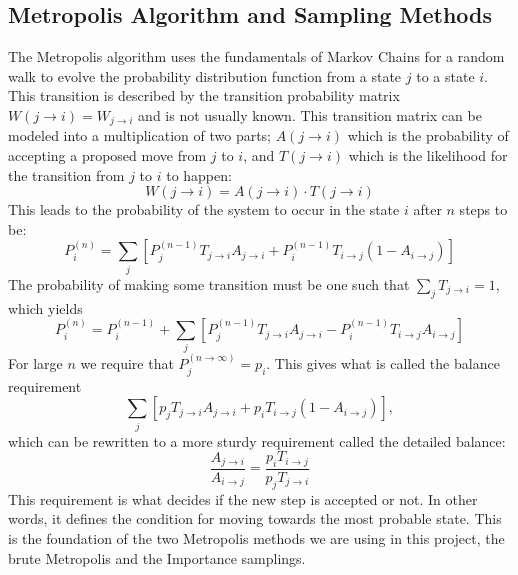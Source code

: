 \documentclass[12pt,a4paper,english]{article}
\begin{document}
\subsection{Metropolis Algorithm and Sampling Methods}
\label{subsect:Sampling}
The Metropolis algorithm uses the fundamentals of Markov Chains for a random walk to evolve the probability distribution function from a state $j$ to a state $i$. This transition is described by the transition probability matrix $W(j\rightarrow i)=W_{j\rightarrow i}$ and is not usually known. This transition matrix can be modeled into a multiplication of two parts; $A(j\rightarrow i)$ which is the probability of accepting a proposed move from $j$ to $i$, and $T(j\rightarrow i)$ which is the likelihood for the transition from $j$ to $i$ to happen: 
\begin{equation}
\label{eq:Transition_prob}
W(j\rightarrow i)=A(j\rightarrow i)\cdot T(j\rightarrow i)
\end{equation}
This leads to the probability of the system to occur in the state $i$ after $n$ steps to be:
\begin{equation*}
\label{eq:Prob_state1}
P_i^{(n)}=\sum_{j}\left[P_j^{(n-1)}T_{j\rightarrow i}A_{j\rightarrow i}+ P_i^{(n-1)}T_{i\rightarrow j}(1-A_{i\rightarrow j})\right]
\end{equation*}
The probability of making some transition must be one such that $\sum_{j}T_{j\rightarrow i}=1$, which yields
\begin{equation*}
\label{eq:Prob_state2}
P_i^{(n)}=P_i^{(n-1)}+\sum_{j}\left[P_j^{(n-1)}T_{j\rightarrow i}A_{j\rightarrow i}- P_i^{(n-1)}T_{i\rightarrow j}A_{i\rightarrow j}\right]
\end{equation*}
For large $n$ we require that $P_j^{(n\rightarrow\infty)}=p_i$. This gives what is called the balance requirement
\[\sum_{j}\left[p_jT_{j\rightarrow i}A_{j\rightarrow i}+ p_iT_{i\rightarrow j}(1-A_{i\rightarrow j})\right],\]
which can be rewritten to a more sturdy requirement called the detailed balance:
\begin{equation}
\label{eq:detailed_balance}
\frac{A_{j\rightarrow i}}{A_{i\rightarrow j}}=\frac{p_iT_{i\rightarrow j}}{p_jT_{j\rightarrow i}}
\end{equation}
This requirement is what decides if the new step is accepted or not. In other words, it defines the condition for moving towards the most probable state. This is the foundation of the two Metropolis methods we are using in this project, the brute Metropolis and the Importance samplings.
\end{document}

